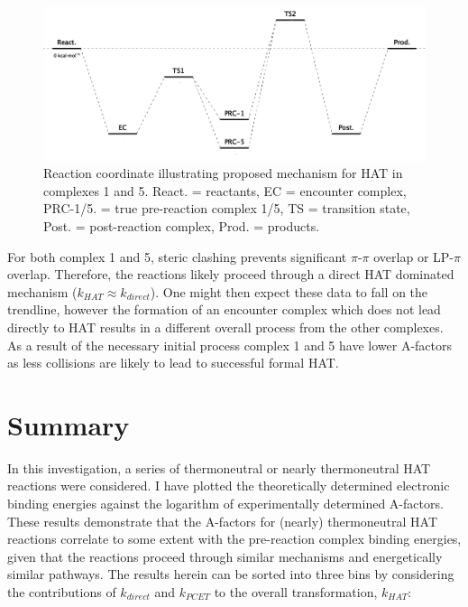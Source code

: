 
\begin{figure}[!htbp]
  \centering
  \includegraphics[width=\textwidth]{figures/encounter-pes.png}
  \caption[Reaction coordinate illustrating proposed mechanism for HAT in complexes 1 and 5.]{Reaction coordinate illustrating proposed mechanism for HAT in complexes 1 and 5. React. = reactants, EC = encounter complex, PRC-1/5. = true pre-reaction complex 1/5, TS = transition state, Post. = post-reaction complex, Prod. = products.}
\label{fig:encounter-pes}
\end{figure}

For both complex 1 and 5, steric clashing prevents significant $\pi$-$\pi$ overlap or LP-$\pi$ overlap. Therefore, the reactions likely proceed through a direct HAT dominated mechanism ($k_{HAT} \approx k_{direct}$). One might then expect these data to fall on the trendline, however the formation of an encounter complex which does not lead directly to HAT results in a different overall process from the other complexes. As a result of the necessary initial process complex 1 and 5 have lower A-factors as less collisions are likely to lead to successful formal HAT.


\section{Summary}

In this investigation, a series of thermoneutral or nearly thermoneutral HAT reactions were considered. I have plotted the theoretically determined electronic binding energies against the logarithm of experimentally determined A-factors. These results demonstrate that the A-factors for (nearly) thermoneutral HAT reactions correlate to some extent with the pre-reaction complex binding energies, given that the reactions proceed through similar mechanisms and energetically similar pathways. The results herein can be sorted into three bins by considering the contributions of $k_{direct}$ and $k_{PCET}$ to the overall transformation, $k_{HAT}$:

